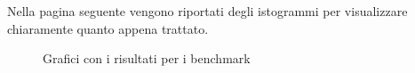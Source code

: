 \documentclass[a4paper, 12pt, oneside]{book}
\theoremstyle{normal}
\begin{document}
\\ \\ Nella pagina seguente vengono riportati degli istogrammi per visualizzare chiaramente quanto appena trattato.
\clearpage
\begin{figure}[h]
  \centering
  \caption{Grafici con i risultati per i benchmark}
  \label{diagram:histograms}
\end{figure}
\end{document}
